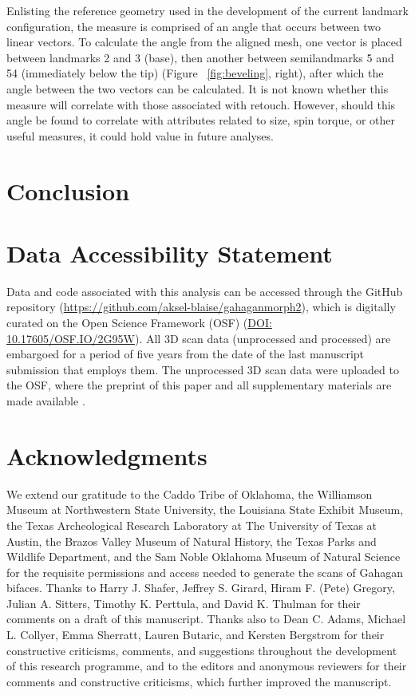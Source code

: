 \documentclass[review]{elsarticle}
\begin{document}
Enlisting the reference geometry used in the development of the current landmark configuration, the measure is comprised of an angle that occurs between two linear vectors. To calculate the angle from the aligned mesh, one vector is placed between landmarks 2 and 3 (base), then another between semilandmarks 5 and 54 (immediately below the tip) (Figure ~\ref{fig:beveling}, right), after which the angle between the two vectors can be calculated. It is not known whether this measure will correlate with those associated with retouch. However, should this angle be found to correlate with attributes related to size, spin torque, or other useful measures, it could hold value in future analyses.

\section*{Conclusion}


\section*{Data Accessibility Statement}

Data and code associated with this analysis can be accessed through the GitHub repository (\href{https://github.com/aksel-blaise/gahaganmorph2}{https://github.com/aksel-blaise/gahaganmorph2}), which is digitally curated on the Open Science Framework (OSF) (\href{https://osf.io/2g95w/}{DOI: 10.17605/OSF.IO/2G95W}). All 3D scan data (unprocessed and processed) are embargoed for a period of five years from the date of the last manuscript submission that employs them. The unprocessed 3D scan data were uploaded to the OSF, where the preprint of this paper and all supplementary materials are made available \citep{RN20850}.

\section*{Acknowledgments}

We extend our gratitude to the Caddo Tribe of Oklahoma, the Williamson Museum at Northwestern State University, the Louisiana State Exhibit Museum, the Texas Archeological Research Laboratory at The University of Texas at Austin, the Brazos Valley Museum of Natural History, the Texas Parks and Wildlife Department, and the Sam Noble Oklahoma Museum of Natural Science for the requisite permissions and access needed to generate the scans of Gahagan bifaces. Thanks to Harry J. Shafer, Jeffrey S. Girard, Hiram F. (Pete) Gregory, Julian A. Sitters, Timothy K. Perttula, and David K. Thulman for their comments on a draft of this manuscript. Thanks also to Dean C. Adams, Michael L. Collyer, Emma Sherratt, Lauren Butaric, and Kersten Bergstrom for their constructive criticisms, comments, and suggestions throughout the development of this research programme, and to the editors and anonymous reviewers for their comments and constructive criticisms, which further improved the manuscript.
\end{document}
